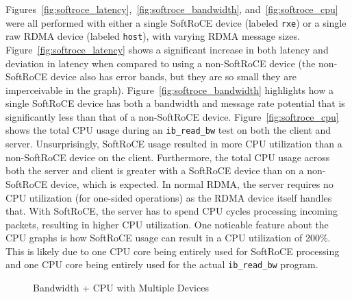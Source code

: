 \documentclass[12pt,titlepage]{article}
\begin{document}
Figures~\ref{fig:softroce_latency},~\ref{fig:softroce_bandwidth}, and~\ref{fig:softroce_cpu} were all performed with either a single SoftRoCE device (labeled \texttt{rxe}) or a single raw RDMA device (labeled \texttt{host}), with varying RDMA message sizes.
Figure~\ref{fig:softroce_latency} shows a significant increase in both latency and deviation in latency when compared to using a non-SoftRoCE device (the non-SoftRoCE device also has error bands, but they are so small they are imperceivable in the graph).
Figure~\ref{fig:softroce_bandwidth} highlights how a single SoftRoCE device has both a bandwidth and message rate potential that is significantly less than that of a non-SoftRoCE device. 
Figure~\ref{fig:softroce_cpu} shows the total CPU usage during an \texttt{ib\_read\_bw} test on both the client and server. 
Unsurprisingly, SoftRoCE usage resulted in more CPU utilization than a non-SoftRoCE device on the client. 
Furthermore, the total CPU usage across both the server and client is greater with a SoftRoCE device than on a non-SoftRoCE device, which is expected.
In normal RDMA, the server requires no CPU utilization (for one-sided operations) as the RDMA device itself handles that.
With SoftRoCE, the server has to spend CPU cycles processing incoming packets, resulting in higher CPU utilization.
One noticable feature about the CPU graphs is how SoftRoCE usage can result in a CPU utilization of 200\%. 
This is likely due to one CPU core being entirely used for SoftRoCE processing and one CPU core being entirely used for the actual \texttt{ib\_read\_bw} program.

\begin{figure}
	\centering
	\caption{Bandwidth + CPU with Multiple Devices}%
	\label{fig:softroce_multi_vdev}
\end{figure}
\end{document}
